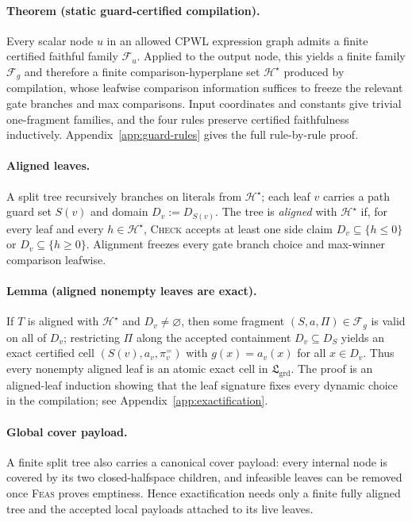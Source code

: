 \documentclass{article}
\begin{document}
\paragraph{Theorem (static guard-certified compilation).}
Every scalar node $u$ in an allowed CPWL expression graph admits a finite certified faithful family $\mathcal F_u$. Applied to the output node, this yields a finite family $\mathcal F_g$ and therefore a finite comparison-hyperplane set $\mathcal H^\star$ produced by compilation, whose leafwise comparison information suffices to freeze the relevant gate branches and max comparisons. Input coordinates and constants give trivial one-fragment families, and the four rules preserve certified faithfulness inductively. Appendix~\ref{app:guard-rules} gives the full rule-by-rule proof.

\paragraph{Aligned leaves.}
A split tree recursively branches on literals from $\mathcal H^\star$; each leaf $v$ carries a path guard set $S(v)$ and domain $D_v:=D_{S(v)}$. The tree is \emph{aligned} with $\mathcal H^\star$ if, for every leaf and every $h\in\mathcal H^\star$, \textsc{Check} accepts at least one side claim $D_v\subseteq\{h\le 0\}$ or $D_v\subseteq\{h\ge 0\}$. Alignment freezes every gate branch choice and max-winner comparison leafwise.

\paragraph{Lemma (aligned nonempty leaves are exact).}
If $T$ is aligned with $\mathcal H^\star$ and $D_v\neq\varnothing$, then some fragment $(S,a,\Pi)\in\mathcal F_g$ is valid on all of $D_v$; restricting $\Pi$ along the accepted containment $D_v\subseteq D_S$ yields an exact certified cell $(S(v),a_v,\pi_v^{=})$ with $g(x)=a_v(x)$ for all $x\in D_v$. Thus every nonempty aligned leaf is an atomic exact cell in $\mathfrak L_{\mathrm{grd}}$. The proof is an aligned-leaf induction showing that the leaf signature fixes every dynamic choice in the compilation; see Appendix~\ref{app:exactification}.

\paragraph{Global cover payload.}
A finite split tree also carries a canonical cover payload: every internal node is covered by its two closed-halfspace children, and infeasible leaves can be removed once \textsc{Feas} proves emptiness. Hence exactification needs only a finite fully aligned tree and the accepted local payloads attached to its live leaves.
\end{document}
